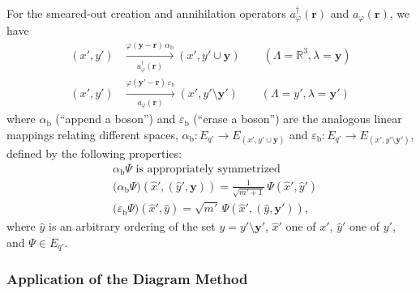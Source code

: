 \documentclass[12pt]{article}
\newcommand{\RRR}{\mathbb{R}} %
\newcommand{\1}{\mathbf{1}} %
\newcommand{\profile}{\varphi}
\newcommand{\vy}{{\boldsymbol y}}
\newcommand{\vr}{{\boldsymbol r}}
\newcommand{\bos}{{\mathrm{b}}} %
\begin{document}
For the smeared-out creation and annihilation operators
$a_\profile^\dag(\vr)$ and $a_\profile(\vr)$, we have
\begin{subequations}
\begin{align}
   (x',y') &\xrightarrow[a_\profile^\dag(\vr)] {\profile(\vy-\vr) \,
   \alpha_\bos} (x',y' \cup \vy) \qquad (\Lambda = \RRR^3, \lambda =
   \vy) \\
   (x',y') &\xrightarrow[a_\profile(\vr)] {\profile(\vy'-\vr) \,
   \varepsilon_\bos} (x', y' \setminus \vy') \qquad (\Lambda = y',
   \lambda = \vy')
\end{align}
\end{subequations}
where $\alpha_\bos$ (``append a boson'') and $\varepsilon_\bos$
(``erase a boson'') are the analogous linear mappings relating
different spaces, $\alpha_\bos: E_{q'} \to E_{(x',y' \cup \vy)}$ and
$\varepsilon_\bos: E_{q'} \to E_{(x',y' \setminus \vy')}$, defined by
the following properties:
\begin{subequations}
\begin{align}
   &\alpha_\bos \Psi\text{ is appropriately symmetrized} \\
   &\big(\alpha_\bos \Psi\big) (\hat{x}',(\hat{y}', \vy)) =
   \frac{1}{\sqrt{m'+1}} \, \Psi(\hat{x}',\hat{y}') \\
   &\big(\varepsilon_\bos \Psi\big) (\hat{x}', \hat{y}) =
   \sqrt{m'} \, \Psi(\hat{x}', (\hat{y}, \vy')),
\end{align}
\end{subequations}
where $\hat{y}$ is an arbitrary ordering of the set $y=y' \setminus
\vy'$, $\hat{x}'$ one of $x'$, $\hat{y}'$ one of $y'$, and $\Psi \in
E_{q'}$.


\subsubsection{Application of the Diagram Method}
\end{document}
